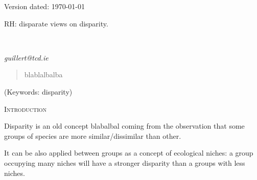 \documentclass[12pt,letterpaper]{article}
\renewcommand{\section}[1]{%
\bigskip
\begin{center}
\begin{Large}
\normalfont\scshape #1
\medskip
\end{Large}
\end{center}}
\begin{document}
\begin{flushright}
Version dated: \today
\end{flushright}
\bigskip
\noindent RH: disparate views on disparity.

\bigskip
\medskip
\begin{center}

\bigskip

\\
\end{center}
\medskip
{} \textit{guillert@tcd.ie}\\  
\vspace{1in}

\modulolinenumbers[1]
\linenumbers

%
%

\newpage
\begin{abstract}

\begin{enumerate}
    blablalbalba
\end{enumerate}

\end{abstract}

\noindent (Keywords: disparity)\\

\vspace{1.5in}

\newpage 

%
%

\section{Introduction}

Disparity is an old concept blabalbal coming from the observation that some groups of species are more similar/dissimilar than other.

It can be also applied between groups as a concept of ecological niches: a group occupying many niches will have a stronger disparity than a groups with less niches.
\end{document}
